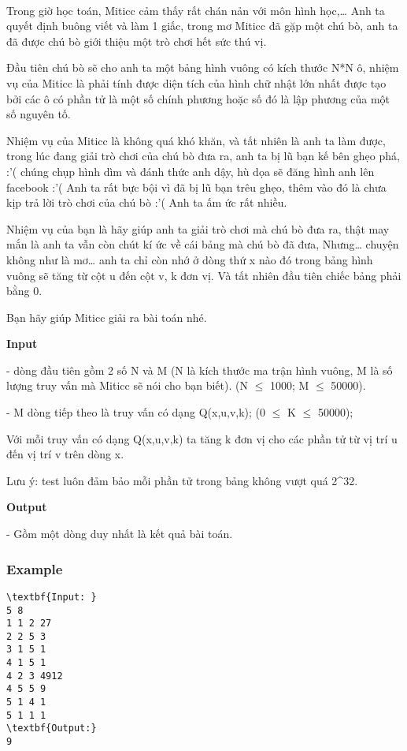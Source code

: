 

 

Trong giờ học toán, Miticc cảm thấy rất chán nản với môn hình học,… Anh ta quyết định buông viết và làm 1 giấc, trong mơ Miticc đã gặp một chú bò, anh ta đã được chú bò giới thiệu một trò chơi hết sức thú vị.

Đầu tiên chú bò sẽ cho anh ta một bảng hình vuông có kích thước N*N ô, nhiệm vụ của Miticc là phải tính được diện tích của hình chữ nhật lớn nhất được tạo bởi các ô có phần tử là một số chính phương hoặc số đó là lập phương của một số nguyên tố.

Nhiệm vụ của Miticc là không quá khó khăn, và tất nhiên là anh ta làm được, trong lúc đang giải trò chơi của chú bò đưa ra, anh ta bị lũ bạn kế bên ghẹo phá, :’( chúng chụp hình dìm và đánh thức anh dậy, hù dọa sẽ đăng hình anh lên facebook :’( Anh ta rất bực bội vì đã bị lũ bạn trêu ghẹo, thêm vào đó là chưa kịp trả lời trò chơi của chú bò :’( Anh ta ấm ức rất nhiều.

Nhiệm vụ của bạn là hãy giúp anh ta giải trò chơi mà chú bò đưa ra, thật may mắn là anh ta vẫn còn chút kí ức về cái bảng mà chú bò đã đưa, Nhưng… chuyện không như là mơ… anh ta chỉ còn nhớ ở dòng thứ x nào đó trong bảng hình vuông sẽ tăng từ cột u đến cột v, k đơn vị. Và tất nhiên đầu tiên chiếc bảng phải bằng 0.

Bạn hãy giúp Miticc giải ra bài toán nhé.

\textbf{Input }

- dòng đầu tiên gồm 2 số N và M (N là kích thước ma trận hình vuông, M là số lượng truy vấn mà Miticc sẽ nói cho bạn biết). (N $\le$ 1000; M $\le$ 50000).

- M dòng tiếp theo là truy vấn có dạng Q(x,u,v,k); (0 $\le$ K $\le$ 50000);

Với mỗi truy vấn có dạng Q(x,u,v,k) ta tăng k đơn vị cho các phần tử từ vị trí u đến vị trí v trên dòng x.

Lưu ý: test luôn đảm bảo mỗi phần tử trong bảng không vượt quá 2\textasciicircum32.

\textbf{Output }

- Gồm một dòng duy nhất là kết quả bài toán.

\subsubsection{Example}
\begin{verbatim}
\textbf{Input: }
5 8
1 1 2 27
2 2 5 3
3 1 5 1
4 1 5 1
4 2 3 4912
4 5 5 9
5 1 4 1
5 1 1 1
\textbf{Output:}
9\end{verbatim}
